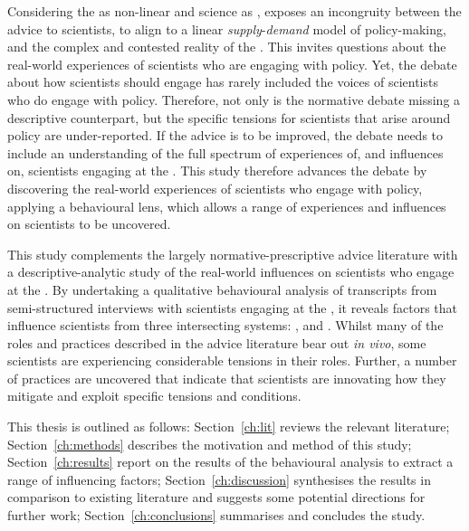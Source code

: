 Considering the \SPI{} as non-linear and \CAN{} science as \PNS, exposes an incongruity between the advice to scientists, to align to a linear \emph{supply}-\emph{demand} model of policy-making, and the complex and contested reality of the \CAN{} \SPI. This  invites questions about the real-world experiences of \CAN{} scientists who are engaging with policy. Yet, the debate about how scientists should engage has rarely included the voices of \CAN{} scientists who do engage with policy. Therefore, not only is the normative debate missing a descriptive counterpart, but the specific tensions for scientists that arise around \CAN{} policy are under-reported. If the advice is to be improved, the debate needs to include an understanding of the full spectrum of experiences of, and influences on, scientists engaging at the \CAN{} \SPI. This study therefore advances the debate by discovering the real-world experiences of \CAN{} scientists who engage with policy,  applying a behavioural lens, which allows a range of experiences and influences on scientists to be uncovered.

This study complements the largely normative-prescriptive advice literature with a descriptive-analytic study of the real-world influences on scientists who engage at the \CAN{} \SPI. By undertaking a qualitative behavioural analysis of transcripts from semi-structured interviews with scientists engaging at the \CAN{} \SPI{}, it reveals factors that influence scientists from three intersecting systems: \inte, \know{} and \scip. Whilst many of the roles and practices described in the advice literature bear out \emph{in vivo}, some scientists are experiencing considerable tensions in their roles. Further, a number of practices are uncovered that indicate that scientists are innovating how they mitigate and exploit specific tensions and conditions. 

This thesis is outlined as follows: Section~\ref{ch:lit} reviews the relevant literature; Section~\ref{ch:methods} describes the motivation and method of this study; Section~\ref{ch:results} report on the results of the behavioural analysis to extract a range of influencing factors; Section~\ref{ch:discussion} synthesises the results in comparison to existing literature and suggests some potential directions for further work; Section~\ref{ch:conclusions} summarises and concludes the study.

